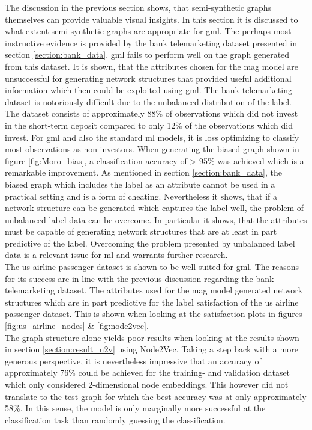   The discussion in the previous section shows, that semi-synthetic graphs
  themselves can provide valuable visual insights. In this section it is
  discussed to what extent semi-synthetic graphs are appropriate for \acs{gml}. 
  The perhaps most instructive evidence is provided by the bank telemarketing 
  dataset presented in section \ref{section:bank_data}. \acs{gml} fails to 
  perform well on the graph generated from this dataset. It is shown, that the 
  attributes chosen for the \acs{mag} model are unsuccessful for generating 
  network structures that provided useful additional information which then 
  could be exploited using \acs{gml}. The bank telemarketing dataset is 
  notoriously difficult due to the unbalanced distribution of the label. The 
  dataset consists of approximately 88\% of observations which did not invest 
  in the short-term deposit compared to only 12\% of the observations which did 
  invest. For \acs{gml} and also the standard \acs{ml} models, it is loss 
  optimizing to classify most observations as non-investors. When generating 
  the biased graph shown in figure \ref{fig:Moro_bias}, a classification 
  accuracy of > 95\% was achieved which is a remarkable improvement. As 
  mentioned in section \ref{section:bank_data}, the biased graph which includes 
  the label as an attribute cannot be used in a practical setting and is a form of
  cheating. Nevertheless it shows, that if a network structure can be generated
  which captures the label well, the problem of unbalanced label data can be
  overcome. In particular it shows, that the attributes must be capable of
  generating network structures that are at least in part predictive of the
  label. Overcoming the problem presented by unbalanced label data is a relevant 
  issue for \acs{ml} and warrants further research. \\

  \noindent The \acs{us} airline passenger dataset is shown to be well suited for 
  \acs{gml}. The reasons for its success are in line with the previous 
  discussion regarding the bank telemarketing dataset. The attributes used for 
  the \acs{mag} model generated network structures which are in part predictive 
  for the label satisfaction of the \acs{us} airline passenger dataset. This is 
  shown when looking at the satisfaction plots in figures 
  \ref{fig:us_airline_nodes} \& \ref{fig:node2vec}. \\ 

  \noindent The graph structure alone yields poor results when looking at the 
  results shown in section \ref{section:result_n2v} using Node2Vec. Taking a 
  step back with a more generous perspective, it is nevertheless impressive that 
  an accuracy of approximately 76\% could be achieved for the training- and 
  validation dataset which only considered 2-dimensional node embeddings. This 
  however did not translate to the test graph for which the best accuracy was at 
  only approximately 58\%. In this sense, the model is only marginally more 
  successful at the classification task than randomly guessing the 
  classification. \\

